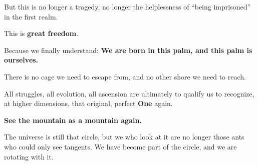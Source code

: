But this is no longer a tragedy, no longer the helplessness of ``being imprisoned'' in the first realm.

This is \textbf{great freedom}.

Because we finally understand: \textbf{We are born in this palm, and this palm is ourselves.}

There is no cage we need to escape from, and no other shore we need to reach.

All struggles, all evolution, all ascension are ultimately to qualify us to recognize, at higher dimensions, that original, perfect \textbf{One} again.

\textbf{See the mountain as a mountain again.}

The universe is still that circle, but we who look at it are no longer those ants who could only see tangents. We have become part of the circle, and we are rotating with it.


